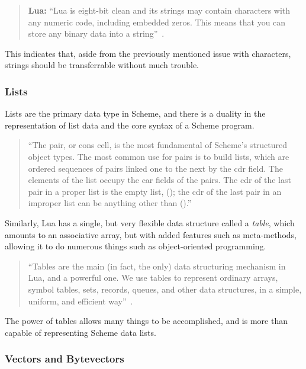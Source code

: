 \begin{quotation}\textbf{Lua:}
``Lua is eight-bit clean and its strings may contain characters with any numeric
code, including embedded zeros. This means that you can store any binary data
into a string''~\cite[p.11]{luabook}.
\end{quotation}

This indicates that, aside from the previously mentioned issue with characters, strings should be transferrable without much trouble.

\subsubsection{Lists}

Lists are the primary data type in Scheme, and there is a duality in the
representation of list data and the core syntax of a Scheme program.

\begin{quotation}
``The pair, or cons cell, is the most fundamental of Scheme's structured object
types. The most common use for pairs is to build lists, which are ordered
sequences of pairs linked one to the next by the cdr field. The elements of the
list occupy the car fields of the pairs. The cdr of the last pair in a proper
list is the empty list, (); the cdr of the last pair in an improper list can be
anything other than ().''~\cite[Sec~6.4]{tspl}
\end{quotation}


Similarly, Lua has a single, but very flexible data structure called a
\emph{table}, which amounts to an associative array, but with added features
such as meta-methods, allowing it to do numerous things such as object-oriented
programming.
\begin{quotation}
``Tables are the main (in fact, the only) data structuring mechanism in Lua, and
a powerful one. We use tables to represent ordinary arrays, symbol tables, sets,
records, queues, and other data structures, in a simple, uniform, and efficient
way''~\cite[p.14]{luabook}.
\end{quotation}

The power of tables allows many things to be accomplished, and is more than
capable of representing Scheme data lists.


\subsubsection{Vectors and Bytevectors}

